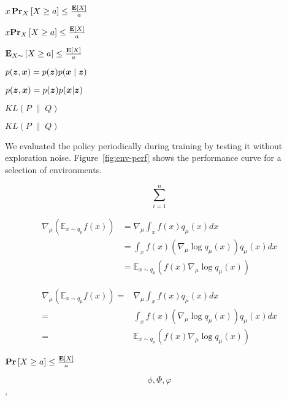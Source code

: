 \documentclass[11pt]{article}
\begin{document}
$ x\operatorname*{\mathbf{Pr}}_{X} \left[ X \geq a \right] \leq \frac{\mathbf{E}[X]}{a}$

$ x\mathbf{Pr}_{X} \left[ X \geq a \right] \leq \frac{\mathbf{E}[X]}{a}$

$ \operatorname*{\mathbf{E}}_{X \sim} \left[ X \geq a \right] \leq \frac{\mathbf{E}[X]}{a}$


$p(\boldsymbol{z}, {\boldsymbol{x}}) = p(\boldsymbol{z}) p({\boldsymbol{x}} \mid \boldsymbol{z})$

$p(\boldsymbol{z}, {\boldsymbol{x}}) = p(\boldsymbol{z}) p({\boldsymbol{x}} | \boldsymbol{z})$

$KL \left( P \; \middle\| \; Q \right)$

$KL \left( P \; \middle\| \; Q \right)$


We evaluated the policy periodically during training by testing it without exploration noise.
Figure~\ref{fig:env-perf} shows the performance curve for a selection of environments.

$$\sum_{i=1}^n$$

\begin{align*}
    \nabla_{\mu} (\mathbb{E}_{x\sim q_{\mu}} f(x)) & = \nabla_{\mu} \int_x f(x) q_{\mu}(x) dx                                     \\
                                                   & =  \int_x f(x) (\nabla_{\mu} \log q_{\mu}(x))  q_{\mu}(x) dx                 \\
                                                   & = \mathbb{E}_{x \sim q_{\mu}} \left(f(x) \nabla_{\mu} \log q_{\mu}(x)\right)
\end{align*}

\begin{align*}
    \nabla_{\mu} (\mathbb{E}_{x\sim q_{\mu}} f(x))  = & \nabla_{\mu} \int_x f(x) q_{\mu}(x) dx                                     \\
                                                    = & \int_x f(x) (\nabla_{\mu} \log q_{\mu}(x))  q_{\mu}(x) dx                  \\
                                                    = & \mathbb{E}_{x \sim q_{\mu}} \left(f(x) \nabla_{\mu} \log q_{\mu}(x)\right)
\end{align*}

$ \operatorname*{\mathbf{Pr}} \left[ X \geq a \right] \leq \frac{\operatorname*{\mathbf{E}}[X]}{a}$

$$\phi, \Phi, \varphi$$ ,
\end{document}
